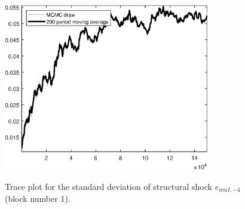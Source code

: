 \begin{figure}[H]
\centering
  \includegraphics[width=0.8\textwidth]{BRS_sectoral_KK/graphs/TracePlot_SE_e_muI_news_blck_1}\\
    \caption{Trace plot for the standard deviation of structural shock ${e_{muI,-4}}$ (block number 1).}
\end{figure}
